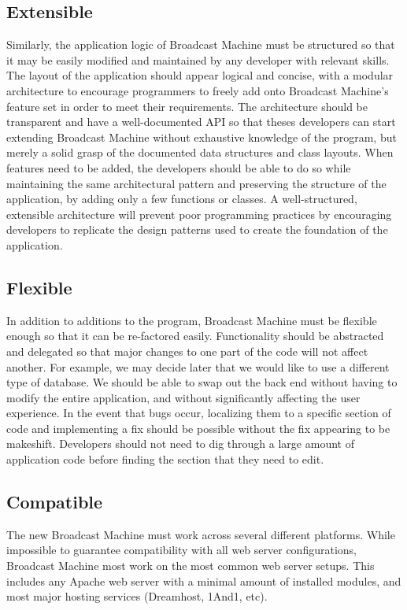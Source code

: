 \documentclass[a4paper,12pt]{report}
\begin{document}
\subsection{Extensible} 
Similarly, the application logic of Broadcast Machine must be structured so that it may be easily modified and maintained by any developer with relevant skills. 
The layout of the application should appear logical and concise, with a modular architecture to encourage programmers to freely add onto Broadcast Machine's feature set in order to meet their requirements.
The architecture should be transparent and have a well-documented API so that theses developers can start extending Broadcast Machine without exhaustive knowledge of the program, but merely a solid grasp of the documented data structures and class layouts. 
When features need to be added, the developers should be able to do so while maintaining the same architectural pattern and preserving the structure of the application, by adding only a few functions or classes. 
A well-structured, extensible architecture will prevent poor programming practices by encouraging developers to replicate the design patterns used to create the foundation of the application.


\subsection{Flexible}
In addition to additions to the program, Broadcast Machine must be flexible enough so that it can be re-factored easily. 
Functionality should be abstracted and delegated so that major changes to one part of the code will not affect another. 
For example, we may decide later that we would like to use a different type of database. 
We should be able to swap out the back end without having to modify the entire application, and without significantly affecting the user experience. 
In the event that bugs occur, localizing them to a specific section of code and implementing a fix should be possible without the fix appearing to be makeshift. 
Developers should not need to dig through a large amount of application code before finding the section that they need to edit. 


\subsection{Compatible}
The new Broadcast Machine must work across several different platforms. 
While impossible to guarantee compatibility with all web server configurations, Broadcast Machine most work on the most common web server setups. 
This includes any Apache web server with a minimal amount of installed modules, and most major hosting services (Dreamhost, 1And1, etc). 
\end{document}
